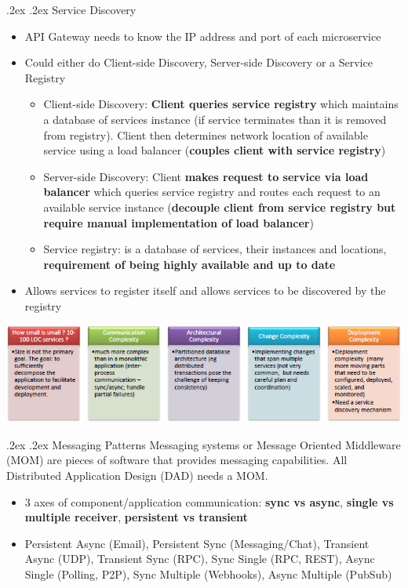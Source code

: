 \documentclass[10pt,landscape,a4paper]{article}
\makeatletter
\renewcommand{\section}{\@startsection{section}{1}{0mm}%
	{.2ex}%
	{.2ex}%
	{\color{myblue}\sffamily\scriptsize\bfseries}}
\renewcommand{\subsubsection}{\@startsection{subsubsection}{1}{0mm}%
	{.2ex}%
	{.2ex}%
	{\rmfamily\bfseries}}
\makeatother
\begin{document}
\begin{multicols*}{4}
		\subsubsection{Service Discovery}
		\begin{itemize}
			\item API Gateway needs to know the IP address and port of each microservice
			\item Could either do Client-side Discovery, Server-side Discovery or a Service Registry
			\begin{itemize}
				\item Client-side Discovery: \textbf{Client queries service registry} which maintains a database of services instance (if service terminates than it is removed from registry). Client then determines network location of available service using a load balancer (\textbf{couples client with service registry})
				\item Server-side Discovery: Client \textbf{makes request to service via load balancer} which queries service registry and routes each request to an available service instance (\textbf{decouple client from service registry but require manual implementation of load balancer})
				\item Service registry: is a database of services, their instances and locations, \textbf{requirement of being highly available and up to date}
			\end{itemize}
			\item Allows services to register itself and allows services to be discovered by the registry
		\end{itemize}
		\begin{center}
			\includegraphics[width=0.75\columnwidth]{microservices-challenges}
		\end{center}
		\section{Messaging Patterns}
		Messaging systems or Message Oriented Middleware (MOM) are pieces of software that provides messaging capabilities. All Distributed Application Design (DAD) needs a MOM.
		\begin{itemize}
			\item 3 axes of component/application communication: \textbf{sync vs async}, \textbf{single vs multiple receiver}, \textbf{persistent vs transient} 
			\item Persistent Async (Email), Persistent Sync (Messaging/Chat), Transient Async (UDP), Transient Sync (RPC), Sync Single (RPC, REST), Async Single (Polling, P2P), Sync Multiple (Webhooks), Async Multiple (PubSub)
		\end{itemize}

\end{multicols*}
\end{document}
